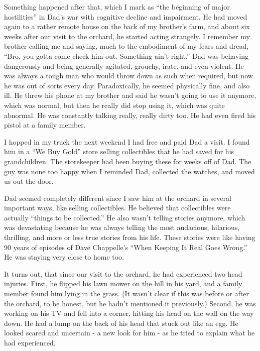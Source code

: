 \documentclass{article}
\begin{document}
Something happened after that, which I mark as ``the beginning of major hostilities'' in Dad's war with cognitive decline and impairment. He had moved again to a rather remote house on the back of my brother's farm, and about six weeks after our visit to the orchard, he started acting strangely. I remember my brother calling me and saying, much to the embodiment of my fears and dread, ``Bro, you gotta come check him out. Something ain't right.'' Dad was behaving dangerously and being generally agitated, grouchy, irate, and even violent. He was always a tough man who would throw down as such when required, but now he was out of sorts every day. Paradoxically, he seemed physically fine, and also ill. He threw his phone at my brother and said he wasn't going to use it anymore, which was normal, but then he really did stop using it, which was quite abnormal. He was constantly talking really, really dirty too. He had even fired his pistol at a family member.

I hopped in my truck the next weekend I had free and paid Dad a visit. I found him in a ``We Buy Gold'' store selling collectibles that he had saved for his grandchildren. The storekeeper had been buying these for weeks off of Dad. The guy was none too happy when I reminded Dad, collected the watches, and moved us out the door.

Dad seemed completely different since I saw him at the orchard in several important ways, like selling collectibles. He believed that collectibles were actually ``things to be collected.'' He also wasn't telling stories anymore, which was devastating because he was always telling the most audacious, hilarious, thrilling, and more or less true stories from his life. These stories were like having 90 years of episodes of Dave Chappelle's ``When Keeping It Real Goes Wrong.'' He was staying very close to home too.

It turns out, that since our visit to the orchard, he had experienced two head injuries. First, he flipped his lawn mower on the hill in his yard, and a family member found him lying in the grass. (It wasn't clear if this was before or after the orchard, to be honest, but he hadn't mentioned it previously.) Second, he was working on his TV and fell into a corner, hitting his head on the wall on the way down. He had a lump on the back of his head that stuck out like an egg. He looked scared and uncertain - a new look for him - as he tried to explain what he had experienced. 
\end{document}
